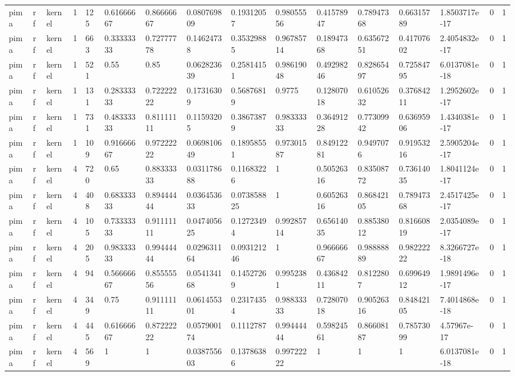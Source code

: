 \begin{tabular}{llllllllllllllll}
pima & rf & kernel & 1 & 125 & 0.61666667 & 0.86666667 & 0.080769809 & 0.19312057 & 0.98055556 & 0.41578947 & 0.78947368 & 0.66315789 & 1.8503717e-17 & 0 & 1 \\
pima & rf & kernel & 1 & 663 & 0.33333333 & 0.72777778 & 0.14624738 & 0.35329885 & 0.96785714 & 0.18947368 & 0.63567251 & 0.41707602 & 2.4054832e-17 & 0 & 1 \\
pima & rf & kernel & 1 & 521 & 0.55 & 0.85 & 0.062823639 & 0.25814151 & 0.98619048 & 0.49298246 & 0.82865497 & 0.72584795 & 6.0137081e-18 & 0 & 1 \\
pima & rf & kernel & 1 & 131 & 0.28333333 & 0.72222222 & 0.17316309 & 0.56876819 & 0.9775 & 0.12807018 & 0.61052632 & 0.37684211 & 1.2952602e-17 & 0 & 1 \\
pima & rf & kernel & 1 & 731 & 0.48333333 & 0.81111111 & 0.11593205 & 0.38673879 & 0.98333333 & 0.36491228 & 0.77309942 & 0.63695906 & 1.4340381e-17 & 0 & 1 \\
pima & rf & kernel & 1 & 109 & 0.91666667 & 0.97222222 & 0.069810649 & 0.18958551 & 0.97301587 & 0.84912281 & 0.9497076 & 0.91953216 & 2.5905204e-17 & 0 & 1 \\
pima & rf & kernel & 4 & 720 & 0.65 & 0.88333333 & 0.031178688 & 0.11683226 & 1 & 0.50526316 & 0.83508772 & 0.73614035 & 1.8041124e-17 & 0 & 1 \\
pima & rf & kernel & 4 & 408 & 0.68333333 & 0.89444444 & 0.036453633 & 0.073858825 & 1 & 0.60526316 & 0.86842105 & 0.78947368 & 2.4517425e-17 & 0 & 1 \\
pima & rf & kernel & 4 & 105 & 0.73333333 & 0.91111111 & 0.047405625 & 0.12723494 & 0.99285714 & 0.65614035 & 0.88538012 & 0.81660819 & 2.0354089e-17 & 0 & 1 \\
pima & rf & kernel & 4 & 205 & 0.98333333 & 0.99444444 & 0.029631164 & 0.093121246 & 1 & 0.96666667 & 0.98888889 & 0.98222222 & 8.3266727e-18 & 0 & 1 \\
pima & rf & kernel & 4 & 94 & 0.56666667 & 0.85555556 & 0.054134168 & 0.14527269 & 0.9952381 & 0.43684211 & 0.8122807 & 0.69964912 & 1.9891496e-17 & 0 & 1 \\
pima & rf & kernel & 4 & 349 & 0.75 & 0.91111111 & 0.061455301 & 0.23174354 & 0.98833333 & 0.72807018 & 0.90526316 & 0.84842105 & 7.4014868e-18 & 0 & 1 \\
pima & rf & kernel & 4 & 445 & 0.61666667 & 0.87222222 & 0.057900174 & 0.1112787 & 0.99444444 & 0.59824561 & 0.86608187 & 0.78573099 & 4.57967e-17 & 0 & 1 \\
pima & rf & kernel & 4 & 569 & 1 & 1 & 0.038755603 & 0.13786386 & 0.99722222 & 1 & 1 & 1 & 6.0137081e-18 & 0 & 1 \\

\end{tabular}
